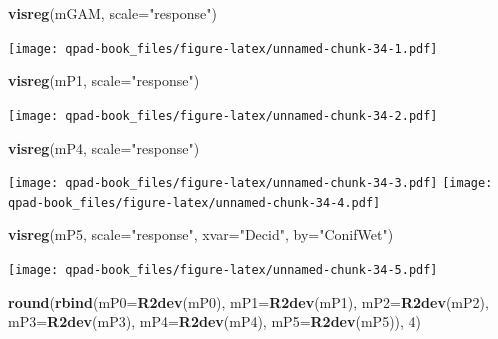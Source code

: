 \documentclass[12pt,]{book}
\newenvironment{Shaded}{\begin{snugshade}}{\end{snugshade}}
\newcommand{\DataTypeTok}[1]{\textcolor[rgb]{0.13,0.29,0.53}{#1}}
\newcommand{\DecValTok}[1]{\textcolor[rgb]{0.00,0.00,0.81}{#1}}
\newcommand{\KeywordTok}[1]{\textcolor[rgb]{0.13,0.29,0.53}{\textbf{#1}}}
\newcommand{\NormalTok}[1]{#1}
\newcommand{\StringTok}[1]{\textcolor[rgb]{0.31,0.60,0.02}{#1}}
\begin{document}
\begin{Shaded}
\begin{Highlighting}[]
\KeywordTok{visreg}\NormalTok{(mGAM, }\DataTypeTok{scale=}\StringTok{"response"}\NormalTok{)}
\end{Highlighting}
\end{Shaded}

\texttt{[image: qpad-book\_files/figure-latex/unnamed-chunk-34-1.pdf]}

\begin{Shaded}
\begin{Highlighting}[]
\KeywordTok{visreg}\NormalTok{(mP1, }\DataTypeTok{scale=}\StringTok{"response"}\NormalTok{)}
\end{Highlighting}
\end{Shaded}

\texttt{[image: qpad-book\_files/figure-latex/unnamed-chunk-34-2.pdf]}

\begin{Shaded}
\begin{Highlighting}[]
\KeywordTok{visreg}\NormalTok{(mP4, }\DataTypeTok{scale=}\StringTok{"response"}\NormalTok{)}
\end{Highlighting}
\end{Shaded}

\texttt{[image: qpad-book\_files/figure-latex/unnamed-chunk-34-3.pdf]} \texttt{[image: qpad-book\_files/figure-latex/unnamed-chunk-34-4.pdf]}

\begin{Shaded}
\begin{Highlighting}[]
\KeywordTok{visreg}\NormalTok{(mP5, }\DataTypeTok{scale=}\StringTok{"response"}\NormalTok{, }\DataTypeTok{xvar=}\StringTok{"Decid"}\NormalTok{, }\DataTypeTok{by=}\StringTok{"ConifWet"}\NormalTok{)}
\end{Highlighting}
\end{Shaded}

\texttt{[image: qpad-book\_files/figure-latex/unnamed-chunk-34-5.pdf]}

\begin{Shaded}
\begin{Highlighting}[]
\KeywordTok{round}\NormalTok{(}\KeywordTok{rbind}\NormalTok{(}\DataTypeTok{mP0=}\KeywordTok{R2dev}\NormalTok{(mP0), }\DataTypeTok{mP1=}\KeywordTok{R2dev}\NormalTok{(mP1), }\DataTypeTok{mP2=}\KeywordTok{R2dev}\NormalTok{(mP2), }\DataTypeTok{mP3=}\KeywordTok{R2dev}\NormalTok{(mP3),}
  \DataTypeTok{mP4=}\KeywordTok{R2dev}\NormalTok{(mP4), }\DataTypeTok{mP5=}\KeywordTok{R2dev}\NormalTok{(mP5)), }\DecValTok{4}\NormalTok{)}
\end{Highlighting}
\end{Shaded}
\end{document}
